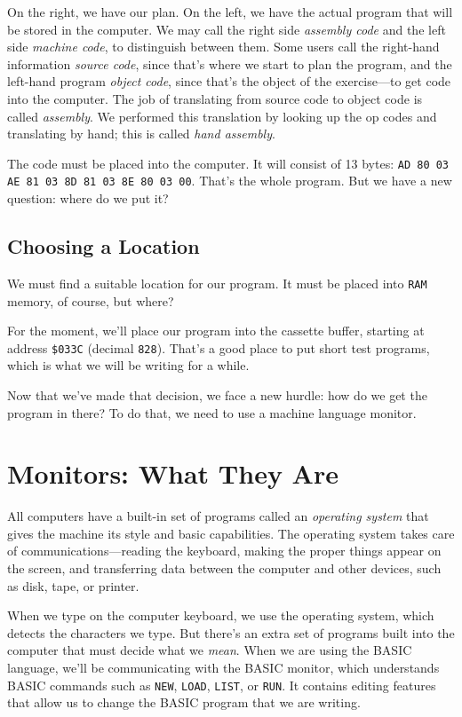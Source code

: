 \documentclass[11pt,a4paper,titlepage]{memoir}
\begin{document}
On the right, we have our plan. On the left, we have the actual program
that will be stored in the computer. We may call the right side \emph{assembly
code} and the left side \emph{machine code}, to distinguish between them. Some
users call the right-hand information \emph{source code}, since that's where we
start to plan the program, and the left-hand program \emph{object code}, since
that's the object of the exercise—to get code into the computer. The job
of translating from source code to object code is called \emph{assembly}. We
performed this translation by looking up the op codes and translating by
hand; this is called \emph{hand assembly}.

The code must be placed into the computer. It will consist of 13 bytes:
\texttt{AD 80 03 AE 81 03 8D 81 03 8E 80 03 00}. That's the
whole program. But we have a new question: where do we put it?
\subsection{Choosing a Location}
We must find a suitable location for our program. It must be placed into
\texttt{RAM} memory, of course, but where?

For the moment, we'll place our program into the cassette buffer, starting
at address \texttt{\$033C} (decimal \texttt{828}). That's a good place to put short test programs, which is what we will be writing for a while.

Now that we've made that decision, we face a new hurdle: how do we get
the program in there? To do that, we need to use a machine language
monitor.
\section{Monitors: What They Are}
All computers have a built-in set of programs called an \emph{operating system}
that gives the machine its style and basic capabilities. The operating system takes care of 
communications—reading the keyboard, making the
proper things appear on the screen, and transferring data between the
computer and other devices, such as disk, tape, or printer.

When we type on the computer keyboard, we use the operating system,
which detects the characters we type. But there's an extra set of programs
built into the computer that must decide what we \emph{mean}. When we are
using the BASIC language, we'll be communicating with the BASIC monitor, which understands BASIC commands such as \texttt{NEW}, \texttt{LOAD}, \texttt{LIST},
or \texttt{RUN}. It contains editing features that allow us to change the BASIC
program that we are writing.
\end{document}
